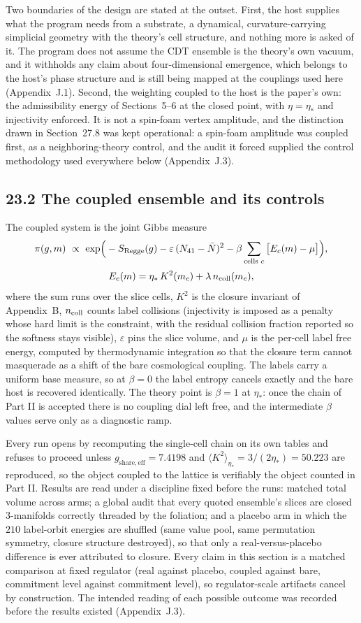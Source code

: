 \documentclass[11pt]{article}
\begin{document}
Two boundaries of the design are stated at the outset. First, the host supplies what the program needs from a substrate, a dynamical, curvature-carrying simplicial geometry with the theory's cell structure, and nothing more is asked of it. The program does not assume the CDT ensemble is the theory's own vacuum, and it withholds any claim about four-dimensional emergence, which belongs to the host's phase structure and is still being mapped at the couplings used here (Appendix~J.1). Second, the weighting coupled to the host is the paper's own: the admissibility energy of Sections~5--6 at the closed point, with $\eta=\eta_*$ and injectivity enforced. It is not a spin-foam vertex amplitude, and the distinction drawn in Section~27.8 was kept operational: a spin-foam amplitude was coupled first, as a neighboring-theory control, and the audit it forced supplied the control methodology used everywhere below (Appendix~J.3).

\subsection{23.2 The coupled ensemble and its controls}

The coupled system is the joint Gibbs measure
\[
\pi(g,m)\ \propto\ \exp\!\Big(-S_{\rm Regge}(g)-\varepsilon\,(N_{41}-\bar N)^2-\beta\sum_{\text{cells }c}\big[E_c(m)-\mu\big]\Big),
\]
\[
E_c(m)=\eta_*\,K^2(m_c)+\lambda\,n_{\rm coll}(m_c),
\]
where the sum runs over the slice cells, $K^2$ is the closure invariant of Appendix~B, $n_{\rm coll}$ counts label collisions (injectivity is imposed as a penalty whose hard limit is the constraint, with the residual collision fraction reported so the softness stays visible), $\varepsilon$ pins the slice volume, and $\mu$ is the per-cell label free energy, computed by thermodynamic integration so that the closure term cannot masquerade as a shift of the bare cosmological coupling. The labels carry a uniform base measure, so at $\beta=0$ the label entropy cancels exactly and the bare host is recovered identically. The theory point is $\beta=1$ at $\eta_*$: once the chain of Part II is accepted there is no coupling dial left free, and the intermediate $\beta$ values serve only as a diagnostic ramp.

Every run opens by recomputing the single-cell chain on its own tables and refuses to proceed unless $g_{\mathrm{share,eff}}=7.4198$ and $\langle K^2\rangle_{\eta_*}=3/(2\eta_*)=50.223$ are reproduced, so the object coupled to the lattice is verifiably the object counted in Part II. Results are read under a discipline fixed before the runs: matched total volume across arms; a global audit that every quoted ensemble's slices are closed $3$-manifolds correctly threaded by the foliation; and a placebo arm in which the $210$ label-orbit energies are shuffled (same value pool, same permutation symmetry, closure structure destroyed), so that only a real-versus-placebo difference is ever attributed to closure. Every claim in this section is a matched comparison at fixed regulator (real against placebo, coupled against bare, commitment level against commitment level), so regulator-scale artifacts cancel by construction. The intended reading of each possible outcome was recorded before the results existed (Appendix~J.3).
\end{document}
